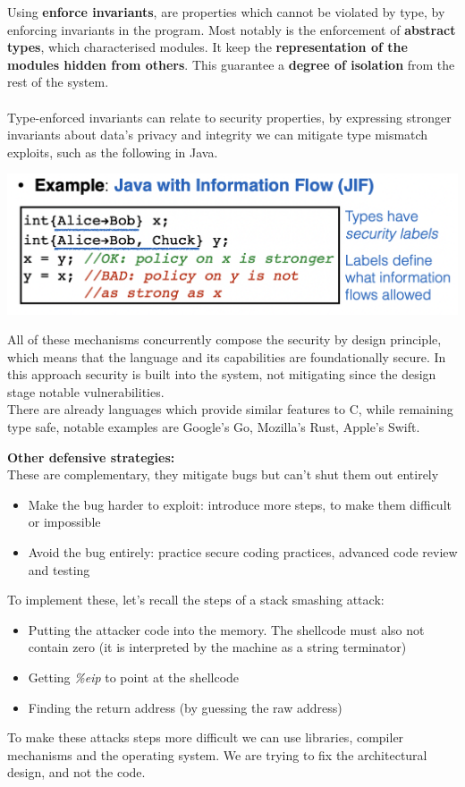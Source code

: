 \documentclass[11pt, oneside]{article}   	%
\begin{document}
\begin{itemize}
Using \textbf{enforce invariants}, are properties which cannot be violated by type, by enforcing invariants in the program. Most notably is the enforcement of \textbf{abstract types}, which characterised modules. It keep the \textbf{representation of the modules hidden from others}. This guarantee a \textbf{degree of isolation} from the rest of the system.\\\\
Type-enforced invariants can relate to security properties, by expressing stronger invariants about data's privacy and integrity we can mitigate type mismatch exploits, such as the following in Java.
\begin{center}
\includegraphics[scale = 0.6]{alice}
\end{center}
All of these mechanisms concurrently compose the security by design principle, which means that the language and its capabilities are foundationally secure. In this approach security is built into the system, not mitigating since the design stage notable vulnerabilities.\\
There are already languages which provide similar features to C, while remaining type safe, notable examples are Google's Go, Mozilla's Rust, Apple's Swift.
\end{itemize}
\textbf{Other defensive strategies:}\\
These are complementary, they mitigate bugs but can't shut them out entirely
\begin{itemize}
\item Make the bug harder to exploit: introduce more steps, to make them difficult or impossible
\item Avoid the bug entirely: practice secure coding practices, advanced code review and testing
\end{itemize}
To implement these, let's recall the steps of a stack smashing attack:
\begin{itemize}
\item Putting the attacker code into the memory. The shellcode must also not contain zero (it is interpreted by the machine as a string terminator)
\item Getting \emph{\%eip} to point at the shellcode
\item Finding the return address (by guessing the raw address)
\end{itemize}
To make these attacks steps more difficult we can use libraries, compiler mechanisms and the operating system. We are trying to fix the architectural design, and not the code.
\end{document}

